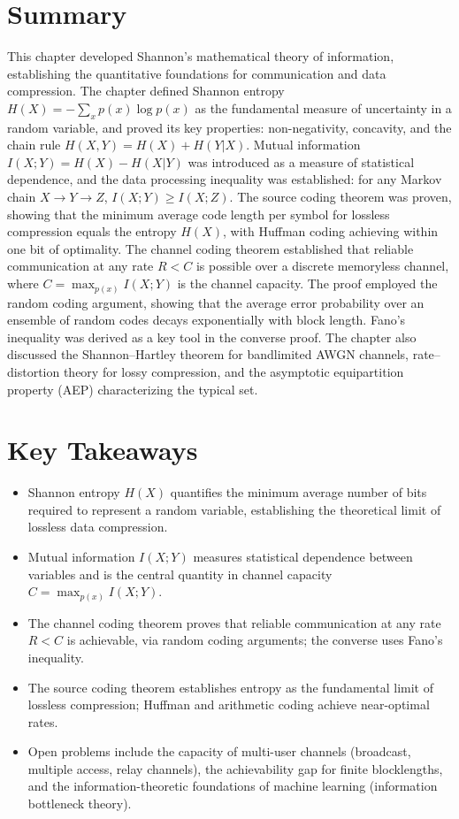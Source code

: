 \section{Summary}
\label{sec:information:summary}

This chapter developed Shannon's mathematical theory of information, establishing the quantitative foundations for communication and data compression. The chapter defined Shannon entropy $H(X) = -\sum_x p(x) \log p(x)$ as the fundamental measure of uncertainty in a random variable, and proved its key properties: non-negativity, concavity, and the chain rule $H(X,Y) = H(X) + H(Y|X)$. Mutual information $I(X;Y) = H(X) - H(X|Y)$ was introduced as a measure of statistical dependence, and the data processing inequality was established: for any Markov chain $X \to Y \to Z$, $I(X;Y) \geq I(X;Z)$. The source coding theorem was proven, showing that the minimum average code length per symbol for lossless compression equals the entropy $H(X)$, with Huffman coding achieving within one bit of optimality. The channel coding theorem established that reliable communication at any rate $R < C$ is possible over a discrete memoryless channel, where $C = \max_{p(x)} I(X;Y)$ is the channel capacity. The proof employed the random coding argument, showing that the average error probability over an ensemble of random codes decays exponentially with block length. Fano's inequality was derived as a key tool in the converse proof. The chapter also discussed the Shannon--Hartley theorem for bandlimited AWGN channels, rate--distortion theory for lossy compression, and the asymptotic equipartition property (AEP) characterizing the typical set.

\section*{Key Takeaways}
\begin{itemize}
\item Shannon entropy $H(X)$ quantifies the minimum average number of bits required to represent a random variable, establishing the theoretical limit of lossless data compression.
\item Mutual information $I(X;Y)$ measures statistical dependence between variables and is the central quantity in channel capacity $C = \max_{p(x)} I(X;Y)$.
\item The channel coding theorem proves that reliable communication at any rate $R < C$ is achievable, via random coding arguments; the converse uses Fano's inequality.
\item The source coding theorem establishes entropy as the fundamental limit of lossless compression; Huffman and arithmetic coding achieve near-optimal rates.
\item Open problems include the capacity of multi-user channels (broadcast, multiple access, relay channels), the achievability gap for finite blocklengths, and the information-theoretic foundations of machine learning (information bottleneck theory).
\end{itemize}

